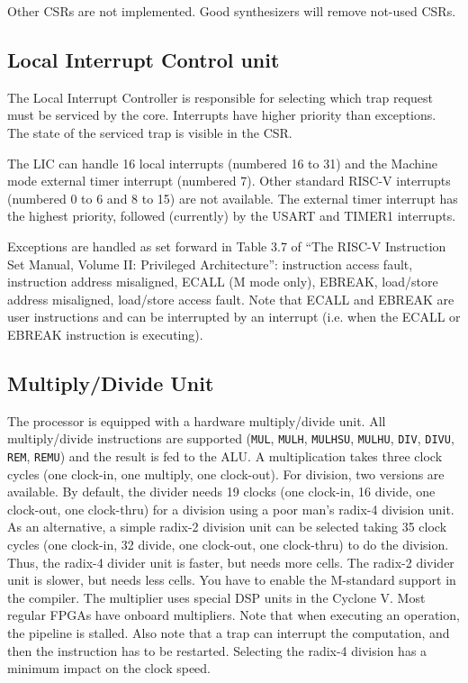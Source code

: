 \documentclass[12pt]{article}
\begin{document}
Other CSRs are not implemented. Good synthesizers will remove not-used CSRs.

\subsection{Local Interrupt Control unit}
The Local Interrupt Controller is responsible for selecting which trap request must be serviced by the core. Interrupts have higher priority than exceptions. The state of the serviced trap is visible in the CSR.

The LIC can handle 16 local interrupts (numbered 16 to 31) and the Machine mode external timer interrupt (numbered 7). Other standard RISC-V interrupts (numbered 0 to 6 and 8 to 15) are not available. The external timer interrupt has the highest priority, followed (currently) by the USART and TIMER1 interrupts.

Exceptions are handled as set forward in Table 3.7 of ``The RISC-V Instruction Set Manual, Volume II: Privileged Architecture'': instruction access fault, instruction address misaligned, ECALL (M mode only), EBREAK, load/store address misaligned, load/store access fault. Note that ECALL and EBREAK are user instructions and can be interrupted by an interrupt (i.e. when the ECALL or EBREAK instruction is executing).

\subsection{Multiply/Divide Unit}
The processor is equipped with a hardware multiply/divide unit. All multiply/divide instructions are supported (\texttt{MUL}, \texttt{MULH}, \texttt{MULHSU}, \texttt{MULHU}, \texttt{DIV}, \texttt{DIVU}, \texttt{REM}, \texttt{REMU}) and the result is fed to the ALU. A multiplication takes three clock cycles (one clock-in, one multiply, one clock-out). For division, two versions are available. By default, the divider needs 19 clocks (one clock-in, 16 divide, one clock-out, one clock-thru) for a division using a poor man's radix-4 division unit. As an alternative, a simple radix-2 division unit can be selected taking 35 clock cycles (one clock-in, 32 divide, one clock-out, one clock-thru) to do the division.  Thus, the radix-4 divider unit is faster, but needs more cells. The radix-2 divider unit is slower, but needs less cells. You have to enable the M-standard support in the compiler. The multiplier uses special DSP units in the Cyclone V. Most regular FPGAs have onboard multipliers. Note that when executing an operation, the pipeline is stalled. Also note that a trap can interrupt the computation, and then the instruction has to be restarted. Selecting the radix-4 division has a minimum impact on the clock speed.
\end{document}
